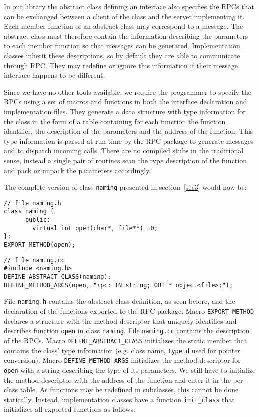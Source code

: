In our library the abstract class defining an interface also
specifies the RPCs that can be exchanged between a client of the
class and the server implementing it. Each member function of an
abstract class may correspond to a message. The abstract class must
therefore contain the information describing the parameters to each
member function so that messages can be generated. Implementation
classes inherit these descriptions, so by default they are able to
communicate through RPC. They may redefine or ignore this information
if their message interface happens to be different.

Since we have no other tools available, we require the programmer to
specify the RPCs using a set of macros and functions in both the
interface declaration and implementation files. They generate a data
structure with type information for the class in the form of
a table containing for each function the function identifier, the
description of the parameters and the address of the function. This
type information is parsed at run-time by the RPC package to generate
messages and to dispatch incoming calls. There are no compiled stubs
in the traditional sense, instead a single pair of routines scan the
type description of the function and pack or unpack the parameters
accordingly.  

The complete version of class {\tt naming} presented in
section~\ref{sec3} would now be:

{\small 
\begin{verbatim}
// file naming.h
class naming {
      public:
        virtual int open(char*, file**) =0;
};
EXPORT_METHOD(open);
\end{verbatim}
}
{\small 
\begin{verbatim}
// file naming.cc
#include <naming.h>
DEFINE_ABSTRACT_CLASS(naming);
DEFINE_METHOD_ARGS(open, "rpc: IN string; OUT * object<file>;");
\end{verbatim}
}

File {\tt naming.h} contains the abstract class definition, as seen
before, and the declaration of the functions exported to the RPC
package. Macro {\tt EXPORT\_METHOD} declares a structure with the
method descriptor that uniquely identifies and describes
function {\tt open} in class {\tt naming}. 
File {\tt naming.cc} contains the description of the RPCs. 
Macro {\tt DEFINE\_ABSTRACT\_CLASS} initializes the static
member that contains the class' type information (e.g. class name,
{\tt typeid} used for pointer conversion). Macro {\tt DEFINE\_METHOD\_ARGS}
initializes the method descriptor for {\tt open} with a string
describing the type of its parameters. We still have to initialize the
method descriptor with the address of the function and enter it
in the per-class table. As functions may be redefined in subclasses,
this cannot be done statically. Instead, implementation classes have a
function {\tt init\_class} that initializes all exported functions as
follows: 

